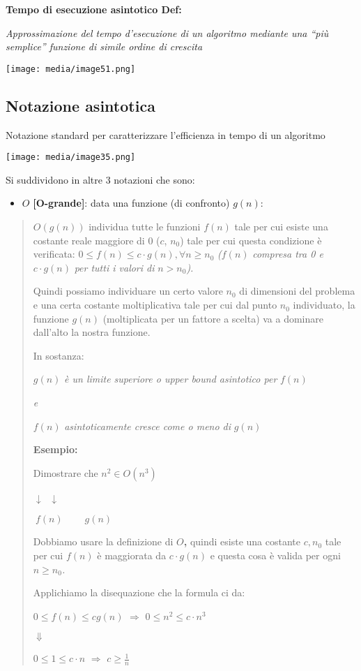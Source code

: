 \textbf{Tempo di esecuzione asintotico \textbar{} Def:}

\emph{Approssimazione del tempo d'esecuzione di un algoritmo mediante
una ``più semplice'' funzione di simile ordine di crescita}

\texttt{[image: media/image51.png]}

\subsection{Notazione asintotica}\label{notazione-asintotica}

Notazione standard per caratterizzare l'efficienza in tempo di un
algoritmo

\texttt{[image: media/image35.png]}

Si suddividono in altre 3 notazioni che sono:

\begin{itemize}
\item
  \(O\) \textbf{{[}O-grande{]}}: data una funzione (di confronto)
  \(g(n)\):
\end{itemize}

\begin{quote}
\(O(g(n))\) individua tutte le funzioni \(f(n)\) tale per cui esiste una
costante reale maggiore di 0 (\(c\), \(n_{0}\)) tale per cui questa
condizione è verificata:
\(0 \leq f(n) \leq c \cdot g(n),\forall n \geq n_{0}\) \emph{(}\(f(n)\)
\emph{compresa tra 0 e} \(c \cdot g(n)\) \emph{per tutti i valori di}
\(n > n_{0}\)\emph{).}

Quindi possiamo individuare un certo valore \(n_{0}\) di dimensioni del
problema e una certa costante moltiplicativa tale per cui dal punto
\(n_{0}\) individuato, la funzione \(g(n)\) (moltiplicata per un fattore
a scelta) va a dominare dall'alto la nostra funzione.

In sostanza:

\(g(n)\) \emph{è un limite superiore o upper bound asintotico per}
\(f(n)\)

\emph{e}

\(f(n)\) \emph{asintoticamente cresce come o meno di} \(g(n)\)

\textbf{Esempio:}

Dimostrare che \(n^{2} \in O(n^{3})\)

\(\downarrow\) \(\  \downarrow\)

\(\ f(n)\ \ \ \ \ \ \ \ \ \ g(n)\ \ \)

Dobbiamo usare la definizione di \(O\)\textbf{,} quindi esiste una
costante \(c,\)\(n_{0}\) tale per cui \(f(n)\) è maggiorata da
\(c \cdot g(n)\) e questa cosa è valida per ogni
\(n \geq n_{0}\)\emph{.}

Applichiamo la disequazione che la formula ci da:

\(0 \leq f(n) \leq cg(n)\) \(\Rightarrow\)
\(0 \leq n^{2} \leq c \cdot n^{3}\)

\(\Downarrow\)

\(0 \leq 1 \leq c \cdot n\) \(\Rightarrow\) \(c \geq \frac{1}{n}\)
\end{quote}

